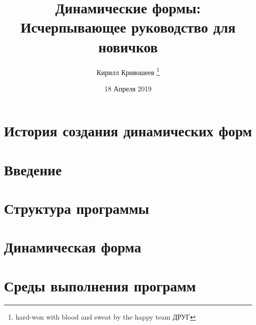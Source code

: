 \documentclass[14pt]{extbook}
\begin{document}
		
 	\pagestyle{empty} 
    \title{Динамические формы: Исчерпывающее руководство для новичков}
	\author{Кирилл Кривошеев \thanks{hard-won with blood and sweat by the happy team ДРУГ}}
    \date{18 Апреля 2019}
    
    \begin{titlepage}
    \maketitle
    \end{titlepage}

    \mainmatter
    \tableofcontents
	
	\pagestyle{fancy} 
	\fancyhead[RE]{\leftmark}
	\fancyhead[LE]{\thepage}
	\fancyhead[LO]{\rightmark}
	\fancyhead[RO]{\thepage}
	\fancyfoot[]{}

	\setcounter{secnumdepth}{0}

    \chapter{История создания динамических форм}
    
    
    \setcounter{secnumdepth}{3}
    
	\chapter{Введение}
	
	
	\chapter{Структура программы}
    

	\chapter{Динамическая форма}\label{sec:dynfom} 
    
    

    \chapter{Среды выполнения программ}\label{sec:environment}
    
    
\end{document}
